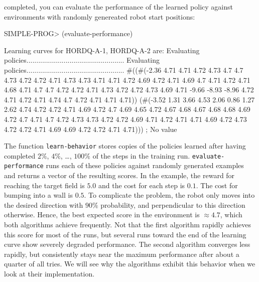 \documentclass[a4paper]{amsart}
\begin{document}
completed, you can evaluate the performance of the learned policy
against environments with randomly genereated robot start positions:
\begin{Code}
  SIMPLE-PROG> (evaluate-performance)

  Learning curves for HORDQ-A-1, HORDQ-A-2 are:
  Evaluating policies..................................................
  Evaluating policies..................................................
  #((#(-2.36 4.71 4.71 4.72 4.73 4.7 4.7
       4.73 4.72 4.72 4.71 4.73 4.73 4.71
       4.71 4.72 4.69 4.72 4.71 4.69 4.7
       4.71 4.72 4.71 4.68 4.71 4.7 4.7
       4.72 4.72 4.71 4.73 4.72 4.72 4.73
       4.69 4.71 -9.66 -8.93 -8.96 4.72
       4.71 4.72 4.71 4.74 4.7 4.72 4.71 4.71 4.71))
    (#(-3.52 1.31 3.66 4.53 2.06 0.86 1.27
       2.62 4.74 4.72 4.72 4.71 4.69
       4.72 4.7 4.69 4.65 4.72 4.67 4.68
       4.67 4.68 4.68 4.69 4.72 4.7 4.71
       4.7 4.72 4.73 4.73 4.72 4.72 4.69
       4.71 4.72 4.71 4.71 4.69 4.72 4.73
       4.72 4.72 4.71 4.69 4.69 4.72 4.72 4.71 4.71)))
  ; No value
\end{Code}
The function \texttt{learn-behavior} stores copies of the policies
learned after having completed $2\%$, $4\%$, \dots, $100\%$ of the
steps in the training run.  \texttt{evaluate-performance} runs each of
these policies against randomly generated examples and returns a
vector of the resulting scores.  In the example, the reward for
reaching the target field is $5.0$ and the cost for each step is
$0.1$.  The cost for bumping into a wall is $0.5$.  To complicate the
problem, the robot only moves into the desired direction with $90\%$
probability, and perpendicular to this direction otherwise.  Hence,
the best expected score in the environment is $\approx4.7$, which
both algorithms achieve frequently.  Not that the first algorithm
rapidly achieves this score for most of the runs, but several runs
toward the end of the learning curve show severely degraded
performance.  The second algorithm converges less rapidly, but
consistently stays near the maximum performance after about a quarter
of all tries.  We will see why the algorithms exhibit this behavior
when we look at their implementation.
\end{document}
